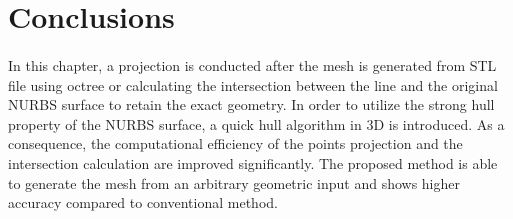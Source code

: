\section{Conclusions}
\paragraph{}
In this chapter, a projection is conducted after the mesh is generated from STL file using octree or calculating the intersection between the line and the original NURBS surface to retain the exact geometry.
In order to utilize the strong hull property of the NURBS surface, a quick hull algorithm in 3D is introduced.
As a consequence, the computational efficiency of the points projection and the intersection calculation are improved significantly.
The proposed method is able to generate the mesh from an arbitrary geometric input and shows higher accuracy compared to conventional method.